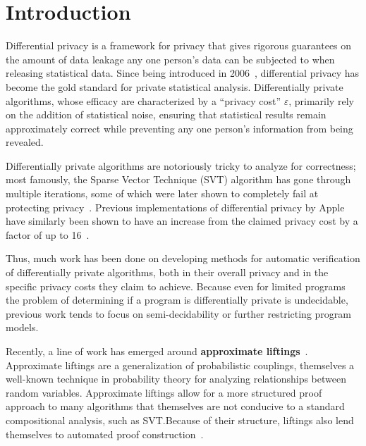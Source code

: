 
\section{Introduction}

Differential privacy is a framework for privacy that gives rigorous guarantees on the amount of data leakage any one person's data can be subjected to when releasing statistical data. Since being introduced in 2006~\cite{DP2006}, differential privacy has become the gold standard for private statistical analysis. 
Differentially private algorithms, whose efficacy are characterized by a ``privacy cost'' $\varepsilon$, primarily rely on the addition of statistical noise, ensuring that statistical results remain approximately correct while preventing any one person's information from being revealed. 

Differentially private algorithms are notoriously tricky to analyze for correctness; most famously, the Sparse Vector Technique (SVT) algorithm has gone through multiple iterations, some of which were later shown to completely fail at protecting privacy~\cite{10.14778/3055330.3055331}. Previous implementations of differential privacy by Apple have similarly been shown to have an increase from the claimed privacy cost by a factor of up to 16~\cite{appleleakprivacy}. 

Thus, much work has been done on developing methods for automatic verification of differentially private algorithms, both in their overall privacy and in the specific privacy costs they claim to achieve. 
Because even for limited programs the problem of determining if a program is differentially private is undecidable\cite{barthe.etal2020decidingdp}, previous work tends to focus on semi-decidability or further restricting program models. 

Recently, a line of work has emerged around \textbf{approximate liftings}~\cite{BartheEtAl2016,bartheKopfOlmedo2012ProbabilisticRelationalReasoningforDifferentialPriv,BartheOlmedo2013,HsuThesis2017}. Approximate liftings are a generalization of probabilistic couplings, themselves a well-known technique in probability theory for analyzing relationships between random variables. 
Approximate liftings allow for a more structured proof approach to many algorithms that themselves are not conducive to a standard compositional analysis, such as SVT.\@ Because of their structure, liftings also lend themselves to automated proof construction~\cite{AlbarghouthiHsu2018}. 

